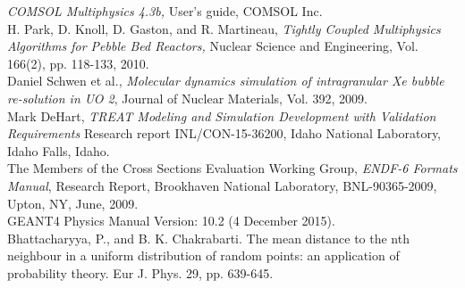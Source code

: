 \documentclass{anstrans}
\begin{document}
\begin{thebibliography}{1}
 {\em COMSOL Multiphysics 4.3b,} User's guide, COMSOL Inc.\\

 H. Park, D. Knoll, D. Gaston, and R. Martineau, {\em Tightly Coupled Multiphysics Algorithms for Pebble Bed Reactors,} Nuclear Science and Engineering, Vol. 166(2), pp. 118-133, 2010.\\

 Daniel Schwen et al., {\em Molecular dynamics simulation of intragranular Xe bubble re-solution in UO 2}, Journal of Nuclear Materials, Vol. 392, 2009.\\

 Mark DeHart, {\em TREAT Modeling and Simulation Development with Validation Requirements} Research report INL/CON-15-36200, Idaho National Laboratory, Idaho Falls, Idaho.\\

%

 The Members of the Cross Sections Evaluation Working Group, {\em ENDF-6 Formats Manual}, Research Report, Brookhaven National Laboratory,
BNL-90365-2009, Upton, NY, June, 2009.  \\

 GEANT4 Physics Manual Version: 10.2 (4 December 2015). \\

 Bhattacharyya, P., and B. K. Chakrabarti. The mean distance to the nth neighbour in a uniform distribution of random points: an application of probability theory. Eur J. Phys. 29, pp. 639-645.\\


\end{thebibliography}
\end{document}
